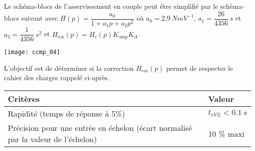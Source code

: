 Le schéma-blocs de l'asservissement en couple peut être simplifié par le schéma-blocs suivant avec 
$H( p)=\dfrac{a_0}{1+a_1 p+a_2 p^2}$ où 
$a_0=\SI{2,9}{NmV^{-1}}$, 
$a_1=\dfrac{26}{4356}\SI{}{s}$ et $a_2=\dfrac{1}{4356}\SI{}{s^2}$ et $H_{\text{cor}}( p)=H_c (p)K_{\text{amp}}K_A$.
\begin{marginfigure}
\texttt{[image: ccmp\_04]}

\end{marginfigure}



\begin{obj}
L'objectif est de déterminer si la correction  $H_{\text{cor}}( p)$ permet de respecter le cahier des charges
rappelé ci-après.
\end{obj}

\begin{center}
\begin{tabular}{p{8cm}l}
\hline
Critères & Valeur \\ \hline
Rapidité (temps de réponse à 5\%) & $t_{r5\%}<\SI{0,1}{s}$ \\ 
Précision pour une entrée en échelon
(écart normalisé par la valeur de l'échelon) & 10 \% maxi \\
\hline
\end{tabular}
\end{center}

%
%
%
%
%
%
%
%
%
%
%

